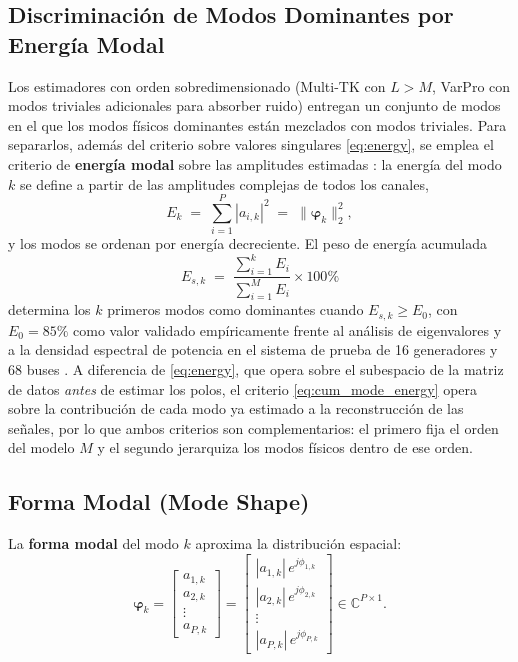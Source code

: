 \subsection{Discriminación de Modos Dominantes por Energía Modal}

Los estimadores con orden sobredimensionado (Multi-TK con $L>M$, VarPro
con modos triviales adicionales para absorber ruido) entregan un conjunto
de modos en el que los modos físicos dominantes están mezclados con modos
triviales. Para separarlos, además del criterio sobre valores singulares
\eqref{eq:energy}, se emplea el criterio de \textbf{energía modal} sobre
las amplitudes estimadas \cite{jiang2021}: la energía del modo $k$ se
define a partir de las amplitudes complejas de todos los canales,
\begin{equation}
    E_k \;=\; \sum_{i=1}^{P} |a_{i,k}|^2
    \;=\; \lVert \mathbf{\varphi}_k \rVert_2^2,
    \label{eq:mode_energy}
\end{equation}
y los modos se ordenan por energía decreciente. El peso de energía
acumulada
\begin{equation}
    E_{s,k} \;=\;
    \frac{\displaystyle\sum_{i=1}^{k} E_i}{\displaystyle\sum_{i=1}^{M} E_i}
    \times 100\%
    \label{eq:cum_mode_energy}
\end{equation}
determina los $k$ primeros modos como dominantes cuando
$E_{s,k} \ge E_0$, con $E_0 = 85\%$ como valor validado empíricamente
frente al análisis de eigenvalores y a la densidad espectral de potencia
en el sistema de prueba de 16 generadores y 68 buses \cite{jiang2021}. A
diferencia de \eqref{eq:energy}, que opera sobre el subespacio de la
matriz de datos \emph{antes} de estimar los polos, el criterio
\eqref{eq:cum_mode_energy} opera sobre la contribución de cada modo ya
estimado a la reconstrucción de las señales, por lo que ambos criterios
son complementarios: el primero fija el orden del modelo $M$ y el segundo
jerarquiza los modos físicos dentro de ese orden.

\subsection{Forma Modal (Mode Shape)}

La \textbf{forma modal} del modo $k$ aproxima la distribución espacial:
\begin{equation}
\mathbf{\varphi}_k =
\begin{bmatrix}
    a_{1,k} \\
    a_{2,k} \\
    \vdots \\
    a_{P,k}
\end{bmatrix}
=
\begin{bmatrix}
    |a_{1,k}|\,e^{j\phi_{1,k}} \\
    |a_{2,k}|\,e^{j\phi_{2,k}} \\
    \vdots \\
    |a_{P,k}|\,e^{j\phi_{P,k}} 
\end{bmatrix} \in \mathbb{C}^{P \times 1}.
\end{equation}


